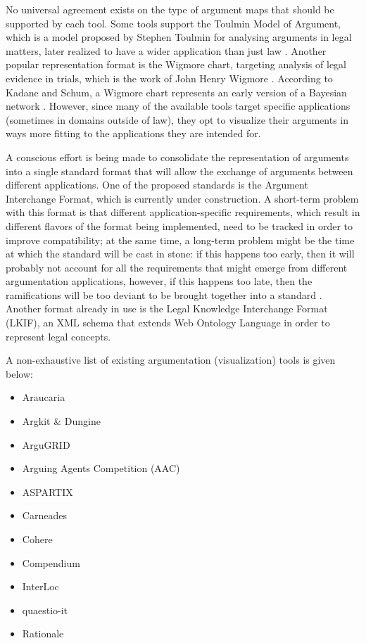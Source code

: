 \documentclass[11pt,twoside,a4paper]{report}
\begin{document}
No universal agreement exists on the type of argument maps that should be supported by each tool. Some tools support the Toulmin Model of Argument, which is a model proposed by Stephen Toulmin for analysing arguments in legal matters, later realized to have a wider application than just law \citep*{usesofargument}. Another popular representation format is the Wigmore chart, targeting analysis of legal evidence in trials, which is the work of John Henry Wigmore \citep*[pp. 123-144]{analysisofevidence}. According to Kadane and Schum, a Wigmore chart represents an early version of a Bayesian network \citep*[pp. 66-76]{saccoandvazetti}. However, since many of the available tools target specific applications (sometimes in domains outside of law), they opt to visualize their arguments in ways more fitting to the applications they are intended for.

A conscious effort is being made to consolidate the representation of arguments into a single standard format that will allow the exchange of arguments between different applications. One of the proposed standards is the Argument Interchange Format, which is currently under construction. A short-term problem with this format is that different application-specific requirements, which result in different flavors of the format being implemented, need to be tracked in order to improve compatibility; at the same time, a long-term problem might be the time at which the standard will be cast in stone: if this happens too early, then it will probably not account for all the requirements that might emerge from different argumentation applications, however, if this happens too late, then the ramifications will be too deviant to be brought together into a standard \citep*[p. 401]{argumentationinai}. Another format already in use is the Legal Knowledge Interchange Format (LKIF), an XML schema that extends Web Ontology Language in order to represent legal concepts.

A non-exhaustive list of existing argumentation (visualization) tools is given below:
\begin{itemize}
\item
Araucaria
\item
Argkit \& Dungine
\item
ArguGRID
\item
Arguing Agents Competition (AAC)
\item
ASPARTIX
\item
Carneades
\item
Cohere
\item
Compendium
\item
InterLoc
\item
quaestio-it
\item
Rationale
\end{itemize}
\end{document}
